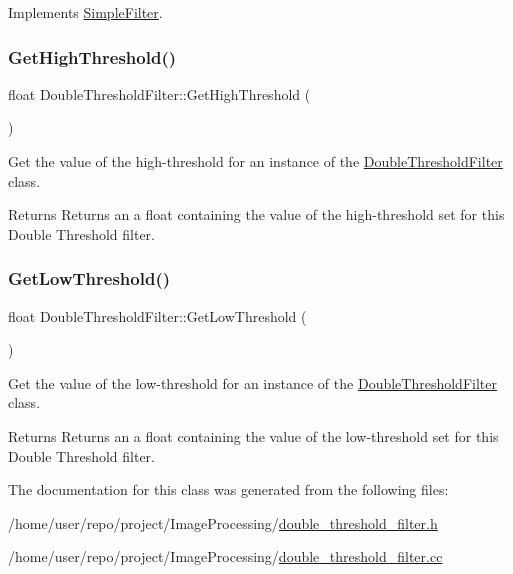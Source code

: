 Implements \hyperlink{classSimpleFilter_aa12dc75dac8932ce03a9c9a3c7964b30}{Simple\+Filter}.

\mbox{\label{classDoubleThresholdFilter_aedbed79b6c46e2a8c76616294ee2be9d}} 
\subsubsection{\texorpdfstring{Get\+High\+Threshold()}{GetHighThreshold()}}
{\footnotesize\ttfamily float Double\+Threshold\+Filter\+::\+Get\+High\+Threshold (\begin{DoxyParamCaption}{ }\end{DoxyParamCaption})}



Get the value of the high-\/threshold for an instance of the \hyperlink{classDoubleThresholdFilter}{Double\+Threshold\+Filter} class. 

\begin{DoxyReturn}{Returns}
Returns an a float containing the value of the high-\/threshold set for this Double Threshold filter. 
\end{DoxyReturn}
\mbox{\label{classDoubleThresholdFilter_a3417a9655273bcf69280aaee6666d25b}} 
\subsubsection{\texorpdfstring{Get\+Low\+Threshold()}{GetLowThreshold()}}
{\footnotesize\ttfamily float Double\+Threshold\+Filter\+::\+Get\+Low\+Threshold (\begin{DoxyParamCaption}{ }\end{DoxyParamCaption})}



Get the value of the low-\/threshold for an instance of the \hyperlink{classDoubleThresholdFilter}{Double\+Threshold\+Filter} class. 

\begin{DoxyReturn}{Returns}
Returns an a float containing the value of the low-\/threshold set for this Double Threshold filter. 
\end{DoxyReturn}


The documentation for this class was generated from the following files\+:\begin{DoxyCompactItemize}
\item 
/home/user/repo/project/\+Image\+Processing/\hyperlink{double__threshold__filter_8h}{double\+\_\+threshold\+\_\+filter.\+h}\item 
/home/user/repo/project/\+Image\+Processing/\hyperlink{double__threshold__filter_8cc}{double\+\_\+threshold\+\_\+filter.\+cc}\end{DoxyCompactItemize}
